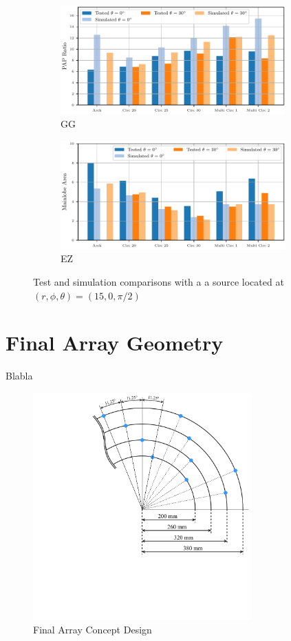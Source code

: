 \begin{figure}[h!]
	\centering
	\begin{subfigure}[b]{1\textwidth}
		\centering
		\includegraphics[width=0.95\textwidth]{images/5_array_evaluation/PapTestSim.pdf}
		\caption{GG}
		\label{fig:comp1}
	\end{subfigure}
	\begin{subfigure}[b]{1\textwidth}
		\centering
		\includegraphics[width=0.95\textwidth]{images/5_array_evaluation/AreaTestSim.pdf}
		\caption{EZ}
		\label{fig:comp2}
	\end{subfigure}
	\caption{Test and simulation comparisons with a a source located at $(r, \phi, \theta) = (15, 0, \pi/2)$}
	\label{fig:TestSim}
\end{figure}


\newpage
\section{Final Array Geometry} \label{sec:final_array_geometry}
Blabla

\begin{figure}[h]
	\centering
	\includegraphics[width=0.75\textwidth, trim={5.5cm 6.0cm 0 0}]{images/5_array_evaluation/final_array_concept_design.pdf}
	\caption{Final Array Concept Design}
	\label{fig:final_array_concept_design}
\end{figure}
